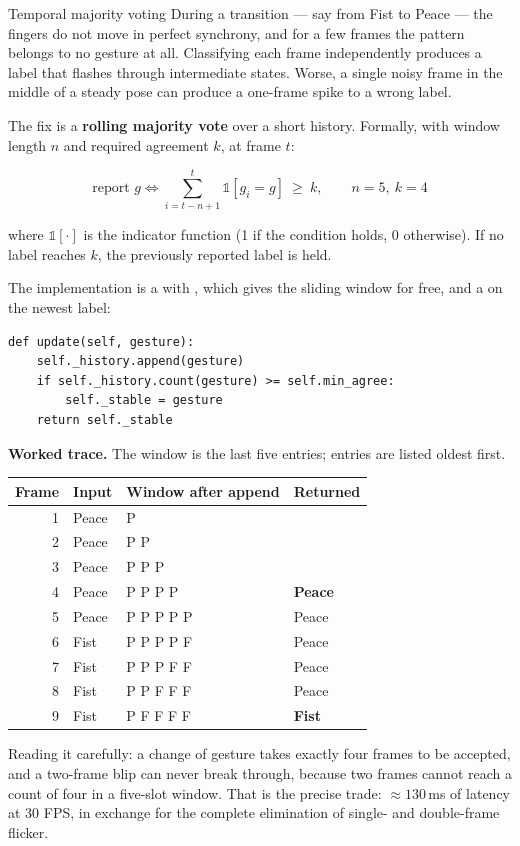 \begin{mathdeepdive}{Temporal majority voting}
During a transition --- say from Fist to Peace --- the fingers do not move in perfect synchrony, and
for a few frames the pattern belongs to no gesture at all. Classifying each frame independently
produces a label that flashes through intermediate states. Worse, a single noisy frame in the middle
of a steady pose can produce a one-frame spike to a wrong label.

The fix is a \textbf{rolling majority vote} over a short history. Formally, with window length $n$
and required agreement $k$, at frame $t$:

$$\text{report } g \iff \sum_{i=t-n+1}^{t} \mathbb{1}\!\left[g_i = g\right] \ \ge\ k,
\qquad n = 5,\ k = 4$$

where $\mathbb{1}[\cdot]$ is the indicator function (1 if the condition holds, 0 otherwise). If no
label reaches $k$, the previously reported label is held.

The implementation is a  with , which gives the sliding window for free,
and a  on the newest label:

\begin{lstlisting}
def update(self, gesture):
    self._history.append(gesture)
    if self._history.count(gesture) >= self.min_agree:
        self._stable = gesture
    return self._stable
\end{lstlisting}

\textbf{Worked trace.} The window is the last five entries; entries are listed oldest first.

\begin{center}
\begin{tabular}{@{}r l l l@{}}
\toprule
\rowcolor{white}
\textbf{Frame} & \textbf{Input} & \textbf{Window after append} & \textbf{Returned} \\
\midrule
1 & Peace & P            & \code{---} \\
2 & Peace & P P          & \code{---} \\
3 & Peace & P P P        & \code{---} \\
4 & Peace & P P P P      & \textbf{Peace} \\
5 & Peace & P P P P P    & Peace \\
6 & Fist  & P P P P F    & Peace \\
7 & Fist  & P P P F F    & Peace \\
8 & Fist  & P P F F F    & Peace \\
9 & Fist  & P F F F F    & \textbf{Fist} \\
\bottomrule
\end{tabular}
\end{center}

Reading it carefully: a change of gesture takes exactly four frames to be accepted, and a two-frame
blip can never break through, because two frames cannot reach a count of four in a five-slot window.
That is the precise trade: $\approx 130$\,ms of latency at 30 FPS, in exchange for the complete
elimination of single- and double-frame flicker.
\end{mathdeepdive}

